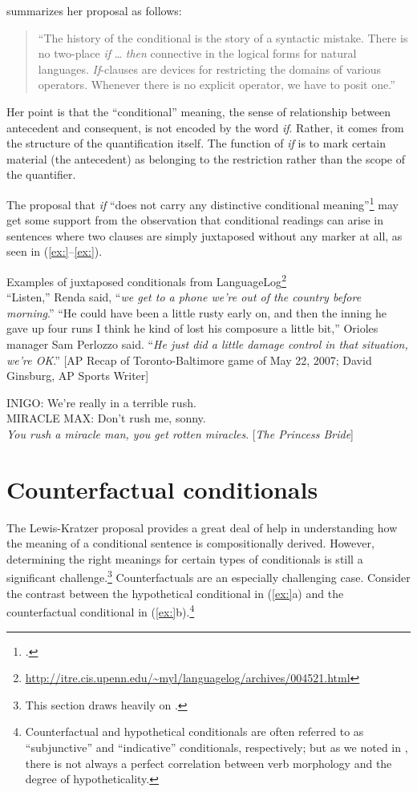 \citet[11]{Kratzer1986} summarizes her proposal as follows:


\begin{quote}
“The history of the conditional is the story of a syntactic mistake. There is no two-place \textit{if} … \textit{then} connective in the logical forms for natural languages. \textit{If}-clauses are devices for restricting the domains of various operators. Whenever there is no explicit operator, we have to posit one.”
\end{quote}


Her point is that the “conditional” meaning, the sense of relationship between antecedent and consequent, is not encoded by the word \textit{if}. Rather, it comes from the structure of the quantification itself. The function of \textit{if} is to mark certain material (the antecedent) as belonging to the restriction rather than the scope of the quantifier.



The proposal that \textit{if} “does not carry any distinctive conditional meaning”\footnote{.} may get some support from the observation that conditional readings can arise in sentences where two clauses are simply juxtaposed without any marker at all, as seen in (\ref{ex:}--\ref{ex:}).


\ea
Examples of juxtaposed conditionals from LanguageLog\footnote{\url{http://itre.cis.upenn.edu/~myl/languagelog/archives/004521.html}} \\
\ea “Listen,” Renda said, “\textit{we get to a phone we’re out of the country before morning}.”
\ex “He could have been a little rusty early on, and then the inning he gave up four runs I think he kind of lost his composure a little bit,” Orioles manager Sam Perlozzo said. “\textit{He just did a little damage control in that situation, we’re OK}.” [AP Recap of Toronto-Baltimore game of May 22, 2007; David Ginsburg, AP Sports Writer]
\z \z

\ea
INIGO: We’re really in a terrible rush.\\
MIRACLE MAX: Don’t rush me, sonny.\\
  \textit{You rush a miracle man, you get rotten miracles}.  [\textit{The Princess Bride}]
\z

\section{Counterfactual conditionals}\label{sec:19.6}


The Lewis-Kratzer proposal provides a great deal of help in understanding how the meaning of a conditional sentence is compositionally derived. However, determining the right meanings for certain types of conditionals is still a significant challenge.\footnote{This section draws heavily on \citet{vonFintel2012}.} Counterfactuals are an especially challenging case. Consider the contrast between the hypothetical conditional in (\ref{ex:}a) and the counterfactual conditional in (\ref{ex:}b).\footnote{Counterfactual and hypothetical conditionals are often referred to as “subjunctive” and “indicative” conditionals, respectively; but as we noted in , there is not always a perfect correlation between verb morphology and the degree of hypotheticality.}


